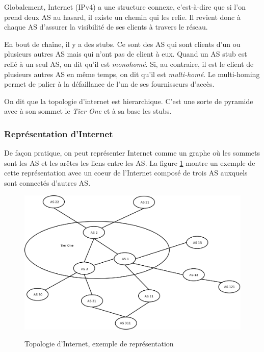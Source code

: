\par
Globalement, Internet (IPv4) a une structure connexe, c'est-\`a-dire que si l'on prend deux AS au hasard, il existe un chemin qui les relie. Il revient donc \`a chaque AS d'assurer la visibilit\'e de ses clients \`a travers le r\'eseau.
\par
En bout de cha\^ine, il y a des stubs. Ce sont des AS qui sont clients d'un ou plusieurs autres AS mais qui n'ont pas de client \`a eux. Quand un AS stub est reli\'e \`a un seul AS, on dit qu'il est \textit{monohom\'e}. Si, au contraire, il est le client de plusieurs autres AS en m\^eme temps, on dit qu'il est \textit{multi-hom\'e}. Le multi-homing permet de palier à la défaillance de l'un de ses fournisseurs d'accès.
\par
On dit que la topologie d'internet est hierarchique. C'est une sorte de pyramide avec à son sommet le \textit{Tier One} et à sa base les stubs.

\subsubsection{Repr\'esentation d'Internet}
\par
De fa\c con pratique, on peut repr\'esenter Internet comme un graphe o\`u les sommets sont les AS et les ar\^etes les liens entre les AS. La figure \ref{topologie} montre un exemple de cette repr\'esentation avec un coeur de l'Internet compos\'e de trois AS auxquels sont connect\'es d'autres AS. 

\begin{figure}[H]
\centering
 \fbox
 {
 \includegraphics[width=16cm]{./schema/topologie_internet.png}
 }
  \caption{\label{topologie}Topologie d'Internet, exemple de repr\'esentation}
\end{figure}



%

